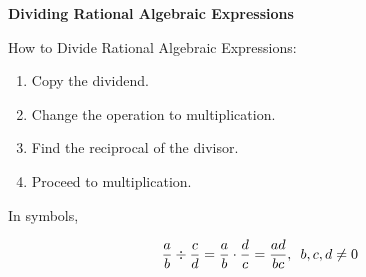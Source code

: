 \begin{center}
\textbf{Dividing Rational Algebraic Expressions
}
\end{center}

\vspce

How to Divide  Rational Algebraic Expressions:
\begin{enumerate}[label = \arabic*. ]
\item Copy the dividend.   
\item Change the operation to multiplication.  
\item Find the reciprocal of the divisor. 
\item Proceed to multiplication. 
\end{enumerate}

\vspce

In symbols, 


\[\displaystyle  \frac{a}{b} \div  \frac{c}{d} = \frac{a}{b} \cdot  \frac{d}{c} =  \frac{ad}{bc} , \hspace{0.5em} b, c, d \neq 0\]


